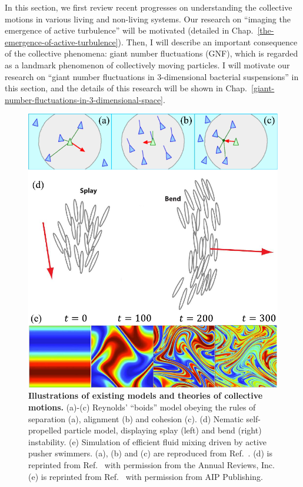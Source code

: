 In this section, we first review recent progresses on understanding the collective motions in various living and non-living systems. Our research on ``imaging the emergence of active turbulence'' will be motivated
(detailed in Chap.~\ref{the-emergence-of-active-turbulence}). Then, I will describe an important consequence of the collective phenomena: giant number fluctuations (GNF), which is regarded as a landmark phenomenon of collectively moving particles. I will motivate our research on ``giant number fluctuations in 3-dimensional bacterial suspensions'' in this section, and the details of this research will be shown in Chap.~\ref{giant-number-fluctuations-in-3-dimensional-space}.

\begin{figure}[!htbp]
	\begin{center}
	\includegraphics[width=5.5 in]{Figs/1-Intro/4.pdf}
	\end{center}
	\caption[Illustrations of existing models and theories of collective motions]
	{
	\textbf{Illustrations of existing models and theories of collective motions.}
	(a)-(c) Reynolds’ “boids” model obeying the rules of separation (a), alignment (b) and cohesion (c).
	(d) Nematic self-propelled particle model, displaying splay (left) and bend (right) instability.
	(e) Simulation of efficient fluid mixing driven by active pusher swimmers.
	(a), (b) and (c) are reproduced from Ref.~\cite{Reynolds1987}.
	(d) is reprinted from Ref.~\cite{Ramaswamy2010} with permission from the Annual Reviews, Inc.
	(e) is reprinted from Ref.~\cite{Saintillan2008b} with permission from AIP Publishing.
	}
	\label{fig:models-of-collective-motions}
\end{figure}

